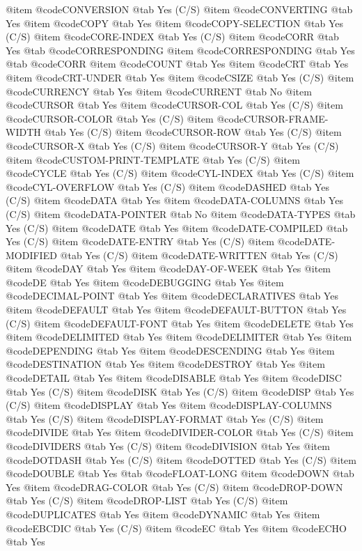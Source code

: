 @item @code{CONVERSION} @tab Yes (C/S)
@item @code{CONVERTING} @tab Yes
@item @code{COPY} @tab Yes
@item @code{COPY-SELECTION} @tab Yes (C/S)
@item @code{CORE-INDEX} @tab Yes (C/S)
@item @code{CORR} @tab Yes @tab @code{CORRESPONDING}
@item @code{CORRESPONDING} @tab Yes @tab @code{CORR}
@item @code{COUNT} @tab Yes
@item @code{CRT} @tab Yes
@item @code{CRT-UNDER} @tab Yes
@item @code{CSIZE} @tab Yes (C/S)
@item @code{CURRENCY} @tab Yes
@item @code{CURRENT} @tab No
@item @code{CURSOR} @tab Yes
@item @code{CURSOR-COL} @tab Yes (C/S)
@item @code{CURSOR-COLOR} @tab Yes (C/S)
@item @code{CURSOR-FRAME-WIDTH} @tab Yes (C/S)
@item @code{CURSOR-ROW} @tab Yes (C/S)
@item @code{CURSOR-X} @tab Yes (C/S)
@item @code{CURSOR-Y} @tab Yes (C/S)
@item @code{CUSTOM-PRINT-TEMPLATE} @tab Yes (C/S)
@item @code{CYCLE} @tab Yes (C/S)
@item @code{CYL-INDEX} @tab Yes (C/S)
@item @code{CYL-OVERFLOW} @tab Yes (C/S)
@item @code{DASHED} @tab Yes (C/S)
@item @code{DATA} @tab Yes
@item @code{DATA-COLUMNS} @tab Yes (C/S)
@item @code{DATA-POINTER} @tab No
@item @code{DATA-TYPES} @tab Yes (C/S)
@item @code{DATE} @tab Yes
@item @code{DATE-COMPILED} @tab Yes (C/S)
@item @code{DATE-ENTRY} @tab Yes (C/S)
@item @code{DATE-MODIFIED} @tab Yes (C/S)
@item @code{DATE-WRITTEN} @tab Yes (C/S)
@item @code{DAY} @tab Yes
@item @code{DAY-OF-WEEK} @tab Yes
@item @code{DE} @tab Yes
@item @code{DEBUGGING} @tab Yes
@item @code{DECIMAL-POINT} @tab Yes
@item @code{DECLARATIVES} @tab Yes
@item @code{DEFAULT} @tab Yes
@item @code{DEFAULT-BUTTON} @tab Yes (C/S)
@item @code{DEFAULT-FONT} @tab Yes
@item @code{DELETE} @tab Yes
@item @code{DELIMITED} @tab Yes
@item @code{DELIMITER} @tab Yes
@item @code{DEPENDING} @tab Yes
@item @code{DESCENDING} @tab Yes
@item @code{DESTINATION} @tab Yes
@item @code{DESTROY} @tab Yes
@item @code{DETAIL} @tab Yes
@item @code{DISABLE} @tab Yes
@item @code{DISC} @tab Yes (C/S)
@item @code{DISK} @tab Yes (C/S)
@item @code{DISP} @tab Yes (C/S)
@item @code{DISPLAY} @tab Yes
@item @code{DISPLAY-COLUMNS} @tab Yes (C/S)
@item @code{DISPLAY-FORMAT} @tab Yes (C/S)
@item @code{DIVIDE} @tab Yes
@item @code{DIVIDER-COLOR} @tab Yes (C/S)
@item @code{DIVIDERS} @tab Yes (C/S)
@item @code{DIVISION} @tab Yes
@item @code{DOTDASH} @tab Yes (C/S)
@item @code{DOTTED} @tab Yes (C/S)
@item @code{DOUBLE} @tab Yes @tab @code{FLOAT-LONG}
@item @code{DOWN} @tab Yes
@item @code{DRAG-COLOR} @tab Yes (C/S)
@item @code{DROP-DOWN} @tab Yes (C/S)
@item @code{DROP-LIST} @tab Yes (C/S)
@item @code{DUPLICATES} @tab Yes
@item @code{DYNAMIC} @tab Yes
@item @code{EBCDIC} @tab Yes (C/S)
@item @code{EC} @tab Yes
@item @code{ECHO} @tab Yes
